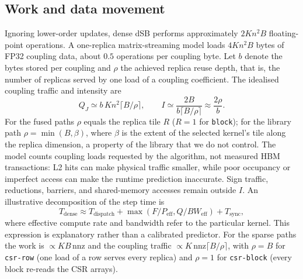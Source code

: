 \documentclass[11pt,a4paper]{article}
\newcommand{\code}[1]{\texttt{#1}}
\begin{document}
\subsection{Work and data movement}
Ignoring lower-order updates, dense dSB performs approximately $2Kn^2B$ floating-point operations. A one-replica matrix-streaming model loads $4Kn^2B$ bytes of FP32 coupling data, about $0.5$ operations per coupling byte. Let $b$ denote the bytes stored per coupling and $\rho$ the achieved replica reuse depth, that is, the number of replicas served by one load of a coupling coefficient. The idealised coupling traffic and intensity are
\begin{equation}
 Q_J\simeq b\,Kn^2\lceil B/\rho\rceil,\qquad
 I\simeq\frac{2B}{b\lceil B/\rho\rceil}\approx\frac{2\rho}{b}.
 \label{eq:intensity}
\end{equation}
For the fused paths $\rho$ equals the replica tile $R$ ($R=1$ for \code{block}); for the library path $\rho=\min(B,\beta)$, where $\beta$ is the extent of the selected kernel's tile along the replica dimension, a property of the library that we do not control. The model counts coupling loads requested by the algorithm, not measured HBM transactions: L2 hits can make physical traffic smaller, while poor occupancy or imperfect access can make the runtime prediction inaccurate. Sign traffic, reductions, barriers, and shared-memory accesses remain outside $I$. An illustrative decomposition of the step time is
\begin{equation}
 T_{\mathrm{dense}}\approx T_{\mathrm{dispatch}}+
 \max(F/P_{\mathrm{eff}},Q/BW_{\mathrm{eff}})+T_{\mathrm{sync}},
 \label{eq:tdense}
\end{equation}
where effective compute rate and bandwidth refer to the particular kernel. This expression is explanatory rather than a calibrated predictor. For the sparse paths the work is $\propto K B\,\mathrm{nnz}$ and the coupling traffic $\propto K\,\mathrm{nnz}\lceil B/\rho\rceil$, with $\rho=B$ for \code{csr-row} (one load of a row serves every replica) and $\rho=1$ for \code{csr-block} (every block re-reads the CSR arrays).
\end{document}

